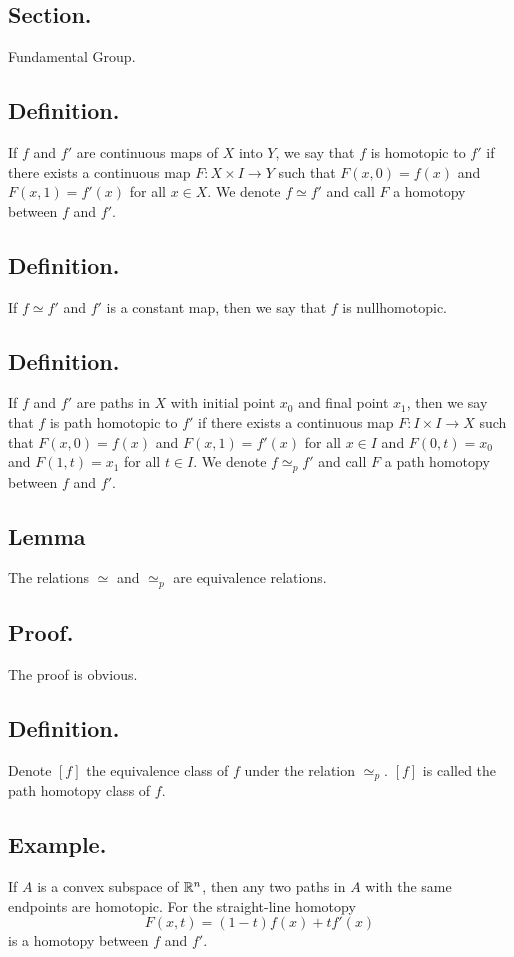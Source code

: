 \documentclass[titlepage]{article}
\begin{document}
\subsection{Section.} Fundamental Group.

\subsection{Definition.} If $f$ and $f'$ are continuous maps of $X$ into $Y$, we say that $f$ is homotopic to $f'$ if there exists a continuous map $F: X \times I \to Y$ such that $F(x, 0) = f(x)$ and $F(x, 1) = f'(x)$ for all $x \in X$. We denote $f \simeq f'$ and call $F$ a homotopy between $f$ and $f'$.

\subsection{Definition.} If $f \simeq f'$ and $f'$ is a constant map, then we say that $f$ is nullhomotopic.

\subsection{Definition.} If $f$ and $f'$ are paths in $X$ with initial point $x_{0}$ and final point $x_{1}$, then we say that $f$ is path homotopic to $f'$ if there exists a continuous map $F: I \times I \to X$ such that $F(x, 0) = f(x)$ and $F(x, 1) = f'(x)$ for all $x \in I$ and $F(0, t) = x_{0}$ and $F(1, t) = x_{1}$ for all $t \in I$. We denote $f \simeq_{p} f'$ and call $F$ a path homotopy between $f$ and $f'$.

\subsection{Lemma} The relations $\simeq$ and $\simeq_{p}$ are equivalence relations.

\subsection{Proof.} The proof is obvious.

\subsection{Definition.} Denote $[f]$ the equivalence class of $f$ under the relation $\simeq_{p}$. $[f]$ is called the path homotopy class of $f$.

\subsection{Example.} If $A$ is a convex subspace of $\mathbb{R}^{n}$, then any two paths in $A$ with the same endpoints are homotopic. For the straight-line homotopy 
$$F(x, t) = (1 - t)f(x) + tf'(x)$$
is a homotopy between $f$ and $f'$.
\end{document}
